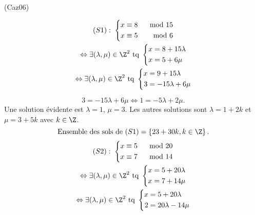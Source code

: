 \begin{tiny}(Caz06)\end{tiny}
\begin{multline*}
  (S1): \;\left\lbrace
  \begin{aligned}
    x &\equiv 8 &\mod 15 \\
    x &\equiv 5 &\mod 6
  \end{aligned}
  \right.\\
\Leftrightarrow
\exists (\lambda, \mu) \in \Z^2 \text{ tq }
  \left\lbrace
  \begin{aligned}
    x &= 8 + 15 \lambda  \\
    x &= 5 + 6\mu
  \end{aligned}
\right.\\
\Leftrightarrow
\exists (\lambda, \mu) \in \Z^2 \text{ tq }
  \left\lbrace
  \begin{aligned}
    x &= 9 + 15 \lambda  \\
    3 &= -15 \lambda + 6\mu
  \end{aligned}
\right.
\end{multline*}

\[
  3 = -15 \lambda + 6 \mu \Leftrightarrow 1 = - 5\lambda + 2\mu.
\]
Une solution évidente est $\lambda = 1$, $\mu = 3$. Les autres solutions sont $\lambda = 1+2k$ et $\mu = 3 + 5k$ avec $k\in \Z$.
\[
\text{Ensemble des sols de }(S1) =  \left\lbrace 23 + 30k, k\in \Z \right\rbrace.
\]
\begin{multline*}
  (S2): \;\left\lbrace
  \begin{aligned}
    x &\equiv 5 &\mod 20 \\
    x &\equiv 7 &\mod 14
  \end{aligned}
  \right.\\
\Leftrightarrow
\exists (\lambda, \mu) \in \Z^2 \text{ tq }
  \left\lbrace
  \begin{aligned}
    x &= 5 + 20 \lambda  \\
    x &= 7 + 14\mu
  \end{aligned}
\right.\\
\Leftrightarrow
\exists (\lambda, \mu) \in \Z^2 \text{ tq }
  \left\lbrace
  \begin{aligned}
    x &= 5 + 20 \lambda  \\
    2 &= 20 \lambda - 14\mu
  \end{aligned}
\right.
\end{multline*}

